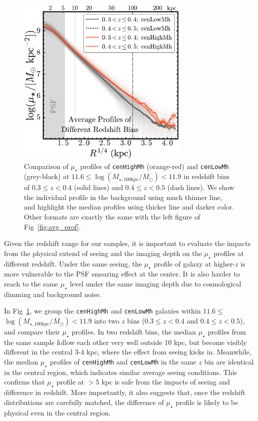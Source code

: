 \documentclass[a4paper,fleqn,usenatbib]{mnras}
\def\rbcg{\texttt{cenHighMh}}
\def\nbcg{\texttt{cenLowMh}}
\def\logmtot{{$\log (M_{\star,100\mathrm{kpc}}/M_{\odot})$}}
\def\mden{{$\mu_{\star}$}}
\begin{document}
\begin{figure}
    \centering 
    \includegraphics[width=8.2cm]{fig/redbcg_avg_prof_z}
    \caption{
        Comparison of \mden{} profiles of \rbcg{} (orange-red) and \nbcg{} 
        (grey-black) at $11.6 \le$\logmtot$< 11.9$ in redshift bins of 
        $0.3\leq z<0.4$ (solid lines) and $0.4\leq z<0.5$ (dash lines). 
        We show the individual profile in the background using much thinner line, 
        and highlight the median profiles using thicker line and darker color.
        Other formats are exactly the same with the left figure of 
        Fig~\ref{fig:avg_prof}.}
    \label{fig:avg_prof_z}
\end{figure}    
    
    Given the redshift range for our samples, it is important to evaluate 
    the impacts from the physical extend of seeing and the imaging depth on the \mden{} 
    profiles at different redshift. 
    Under the same seeing, the \mden{} profile of galaxy at higher-$z$ is more 
    vulnerable to the PSF smearing effect at the center. 
    It is also harder to reach to the same \mden{} level under the same imaging depth 
    due to cosmological dimming and background noise. 
    
    In Fig~\ref{fig:avg_prof_z}, we group the \rbcg{} and \nbcg{} galaxies within 
    $11.6 \le$\logmtot$< 11.9$ into two $z$ bins ($0.3\leq z<0.4$ and $0.4\leq z<0.5$),
    and compare their \mden{} profiles. 
    In two redshift bins, the median \mden{} profiles from the same sample follow each 
    other very well outside 10 kpc, but become visibly different in the central 3-4 kpc,
    where the effect from seeing kicks in. 
    Meanwhile, the median \mden{} profiles of \rbcg{} and \nbcg{} in the same $z$ bin 
    are identical in the central region, which indicates similar average seeing 
    conditions.       
    This confirms that \mden{} profile at $> 5$ kpc is safe from the impacts of seeing 
    and difference in redshift.
    More importantly, it also suggests that, once the redshift distributions are 
    carefully matched, the difference of \mden{} profile is likely to be physical 
    even in the central region.  
\end{document}
